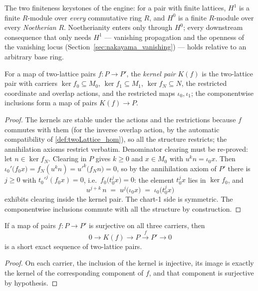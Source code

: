 The two finiteness keystones of the engine: for a pair with finite lattices, \(H^1\) is
a finite \(R\)-module over \emph{every} commutative ring \(R\), and \(H^0\) is a finite
\(R\)-module over every \emph{Noetherian} \(R\). Noetherianity enters only through
\(H^0\); every downstream consequence that only needs \(H^1\) --- vanishing propagation
and the openness of the vanishing locus (Section~\ref{sec:nakayama_vanishing}) --- holds
relative to an arbitrary base ring.

\begin{definition}
  \label{def:twoLattice_kernelPair}
  \leanok
  For a map of two-lattice pairs \(f : P \to P'\), the \emph{kernel pair} \(K(f)\) is
  the two-lattice pair with carriers \(\ker f_0 \subseteq M_0\),
  \(\ker f_1 \subseteq M_1\), \(\ker f_N \subseteq N\), the restricted coordinate and
  overlap actions, and the restricted maps \(\iota_0, \iota_1\); the componentwise
  inclusions form a map of pairs \(K(f) \to P\).
\end{definition}
\begin{proof}
  \leanok
  The kernels are stable under the actions and the restrictions because \(f\) commutes
  with them (for the inverse overlap action, by the automatic compatibility of
  \ref{def:twoLattice_hom}), so all the structure restricts; the annihilation axioms
  restrict verbatim. Denominator clearing must be re-proved: let
  \(n \in \ker f_N\). Clearing in \(P\) gives \(k \ge 0\) and \(x \in M_0\) with
  \(u^k n = \iota_0 x\). Then
  \(\iota_0'\bigl(f_0 x\bigr) = f_N(u^k n) = u'^k\bigl(f_N n\bigr) = 0\), so by the
  annihilation axiom of \(P'\) there is \(j \ge 0\) with \(t_0'^j (f_0 x) = 0\), i.e.\
  \(f_0\bigl(t_0^j x\bigr) = 0\): the element \(t_0^j x\) lies in \(\ker f_0\), and
  \[
    u^{j + k}\, n \;=\; u^j\bigl(\iota_0 x\bigr) \;=\; \iota_0\bigl(t_0^j x\bigr)
  \]
  exhibits clearing inside the kernel pair. The chart-1 side is symmetric. The
  componentwise inclusions commute with all the structure by construction.
\end{proof}

\begin{lemma}
  \label{lem:twoLattice_kernelPair_shortExact}
  \leanok
  If a map of pairs \(f : P \to P'\) is surjective on all three carriers, then
  \[
    0 \longrightarrow K(f) \longrightarrow P \xrightarrow{\ f\ } P' \longrightarrow 0
  \]
  is a short exact sequence of two-lattice pairs.
\end{lemma}
\begin{proof}
  \leanok
  On each carrier, the inclusion of the kernel is injective, its image is exactly the
  kernel of the corresponding component of \(f\), and that component is surjective by
  hypothesis.
\end{proof}

